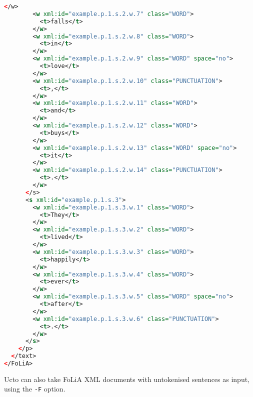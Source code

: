 \documentclass[a4paper,12pt]{report}
\begin{document}
\begin{lstlisting}[language=xml]
        </w>
        <w xml:id="example.p.1.s.2.w.7" class="WORD">
          <t>falls</t>
        </w>
        <w xml:id="example.p.1.s.2.w.8" class="WORD">
          <t>in</t>
        </w>
        <w xml:id="example.p.1.s.2.w.9" class="WORD" space="no">
          <t>love</t>
        </w>
        <w xml:id="example.p.1.s.2.w.10" class="PUNCTUATION">
          <t>,</t>
        </w>
        <w xml:id="example.p.1.s.2.w.11" class="WORD">
          <t>and</t>
        </w>
        <w xml:id="example.p.1.s.2.w.12" class="WORD">
          <t>buys</t>
        </w>
        <w xml:id="example.p.1.s.2.w.13" class="WORD" space="no">
          <t>it</t>
        </w>
        <w xml:id="example.p.1.s.2.w.14" class="PUNCTUATION">
          <t>.</t>
        </w>
      </s>
      <s xml:id="example.p.1.s.3">
        <w xml:id="example.p.1.s.3.w.1" class="WORD">
          <t>They</t>
        </w>
        <w xml:id="example.p.1.s.3.w.2" class="WORD">
          <t>lived</t>
        </w>
        <w xml:id="example.p.1.s.3.w.3" class="WORD">
          <t>happily</t>
        </w>
        <w xml:id="example.p.1.s.3.w.4" class="WORD">
          <t>ever</t>
        </w>
        <w xml:id="example.p.1.s.3.w.5" class="WORD" space="no">
          <t>after</t>
        </w>
        <w xml:id="example.p.1.s.3.w.6" class="PUNCTUATION">
          <t>.</t>
        </w>
      </s>
    </p>
  </text>
</FoLiA>
\end{lstlisting}    

Ucto can also take FoLiA XML documents with untokenised sentences as input, using the \texttt{-F} option.



\end{document}
